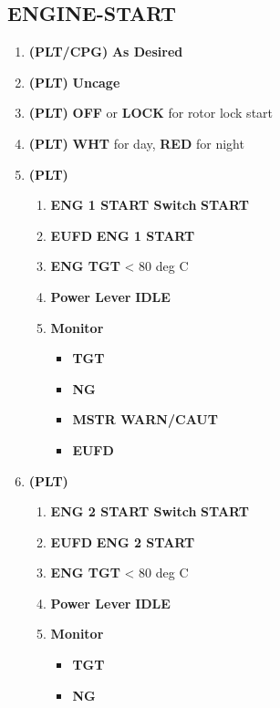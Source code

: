 \documentclass[fontHelvetica]{TechCheck}
\begin{document}
	\subsection{ENGINE-START}
	\begin{enumerate}[leftmargin=0.1\linewidth,rightmargin=0.1\linewidth, itemsep=4pt]
		\item {} \textbf{(PLT/CPG)} \dotfill \textbf{As Desired}
		\item {} \textbf{(PLT)} \dotfill \textbf{Uncage}
		\item {} \textbf{(PLT)} \dotfill \textbf{OFF}  or \textbf{LOCK} for rotor lock start
		\item {} \textbf{(PLT)} \dotfill \textbf{WHT} for day, \textbf{RED} for night 
		\item {} \textbf{(PLT)}
		\begin{enumerate}[itemsep=4pt]
			\item \textbf{ENG 1 START Switch} \dotfill \textbf{START}
			\item \textbf{EUFD} \dotfill \textbf{ENG 1 START}
			\item \textbf{ENG TGT} \dotfill < 80 deg C
			\item \textbf{Power Lever} \dotfill \textbf{IDLE}
			\item \textbf{Monitor}
			\begin{itemize}[itemsep=4pt]
				\item \textbf{TGT}
				\item \textbf{NG}
				\item \textbf{MSTR WARN/CAUT}
				\item \textbf{EUFD}
			\end{itemize}
		\end{enumerate}
		\item {} \textbf{(PLT)}
		\begin{enumerate}[itemsep=4pt]
			\item \textbf{ENG 2 START Switch} \dotfill \textbf{START}
			\item \textbf{EUFD} \dotfill \textbf{ENG 2 START}
			\item \textbf{ENG TGT} \dotfill < 80 deg C
			\item \textbf{Power Lever} \dotfill \textbf{IDLE}
			\item \textbf{Monitor}
			\begin{itemize}[itemsep=4pt]
				\item \textbf{TGT}
				\item \textbf{NG}

\end{itemize}
\end{enumerate}
\end{enumerate}
\end{document}
